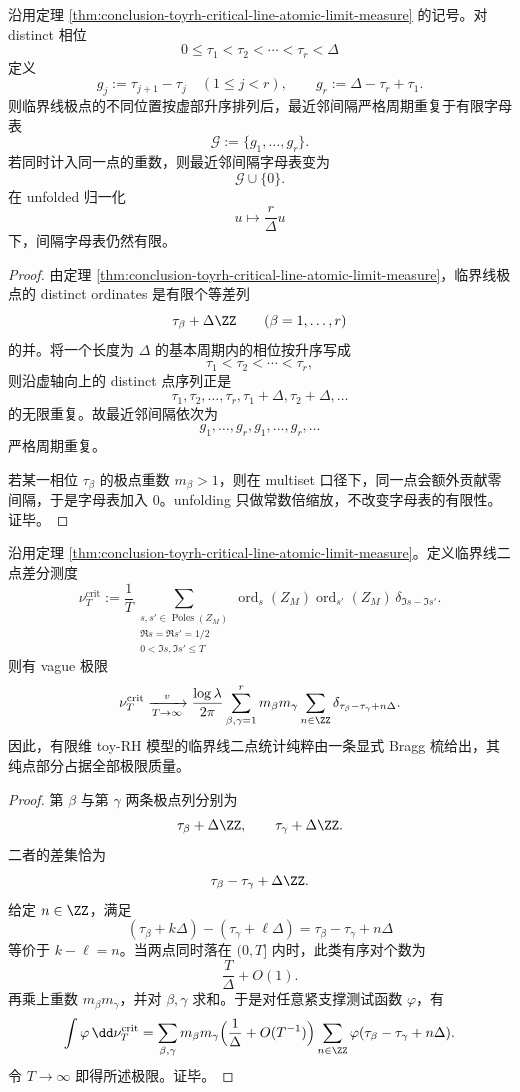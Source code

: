 \begin{theorem}[临界线最近邻间隔的有限字母表]\label{thm:conclusion-toyrh-critical-line-nearest-neighbor-finite-alphabet}
沿用定理 \ref{thm:conclusion-toyrh-critical-line-atomic-limit-measure} 的记号。对 distinct 相位
\[
0\le \tau_1<\tau_2<\cdots<\tau_r<\Delta
\]
定义
\[
g_j:=\tau_{j+1}-\tau_j\quad(1\le j<r),
\qquad
g_r:=\Delta-\tau_r+\tau_1.
\]
则临界线极点的不同位置按虚部升序排列后，最近邻间隔严格周期重复于有限字母表
\[
\mathcal G:=\{g_1,\dots,g_r\}.
\]
若同时计入同一点的重数，则最近邻间隔字母表变为
\[
\mathcal G\cup\{0\}.
\]
在 unfolded 归一化
\[
u\longmapsto \frac{r}{\Delta}u
\]
下，间隔字母表仍然有限。
\end{theorem}
\begin{proof}
由定理 \ref{thm:conclusion-toyrh-critical-line-atomic-limit-measure}，临界线极点的 distinct ordinates 是有限个等差列
\[
\tau_\beta+\Delta\ZZ
\qquad (\beta=1,\dots,r)
\]
的并。将一个长度为 \(\Delta\) 的基本周期内的相位按升序写成
\[
\tau_1<\tau_2<\cdots<\tau_r,
\]
则沿虚轴向上的 distinct 点序列正是
\[
\tau_1,\tau_2,\dots,\tau_r,\tau_1+\Delta,\tau_2+\Delta,\dots
\]
的无限重复。故最近邻间隔依次为
\[
g_1,\dots,g_r,g_1,\dots,g_r,\dots
\]
严格周期重复。

若某一相位 \(\tau_\beta\) 的极点重数 \(m_\beta>1\)，则在 multiset 口径下，同一点会额外贡献零间隔，于是字母表加入 \(0\)。unfolding 只做常数倍缩放，不改变字母表的有限性。证毕。
\end{proof}

\begin{theorem}\label{thm:conclusion-toyrh-critical-line-bragg-comb}
沿用定理 \ref{thm:conclusion-toyrh-critical-line-atomic-limit-measure}。定义临界线二点差分测度
\[
\nu_T^{\mathrm{crit}}
:=
\frac1T
\sum_{\substack{s,s'\in\operatorname{Poles}(Z_M)\\
\Re s=\Re s'=1/2\\
0<\Im s,\Im s'\le T}}
\operatorname{ord}_s(Z_M)\operatorname{ord}_{s'}(Z_M)\,
\delta_{\Im s-\Im s'}.
\]
则有 vague 极限
\[
\nu_T^{\mathrm{crit}}
\xrightarrow[T\to\infty]{v}
\frac{\log\lambda}{2\pi}
\sum_{\beta,\gamma=1}^{r}
m_\beta m_\gamma
\sum_{n\in\ZZ}\delta_{\tau_\beta-\tau_\gamma+n\Delta}.
\]
因此，有限维 toy-RH 模型的临界线二点统计纯粹由一条显式 Bragg 梳给出，其纯点部分占据全部极限质量。
\end{theorem}
\begin{proof}
第 \(\beta\) 与第 \(\gamma\) 两条极点列分别为
\[
\tau_\beta+\Delta\ZZ,
\qquad
\tau_\gamma+\Delta\ZZ.
\]
二者的差集恰为
\[
\tau_\beta-\tau_\gamma+\Delta\ZZ.
\]
给定 \(n\in\ZZ\)，满足
\[
(\tau_\beta+k\Delta)-(\tau_\gamma+\ell\Delta)
=
\tau_\beta-\tau_\gamma+n\Delta
\]
等价于 \(k-\ell=n\)。当两点同时落在 \((0,T]\) 内时，此类有序对个数为
\[
\frac{T}{\Delta}+O(1).
\]
再乘上重数 \(m_\beta m_\gamma\)，并对 \(\beta,\gamma\) 求和。于是对任意紧支撑测试函数 \(\varphi\)，有
\[
\int \varphi\,\dd \nu_T^{\mathrm{crit}}
=
\sum_{\beta,\gamma}
m_\beta m_\gamma
\Bigl(\frac1\Delta+O(T^{-1})\Bigr)
\sum_{n\in\ZZ}\varphi(\tau_\beta-\tau_\gamma+n\Delta).
\]
令 \(T\to\infty\) 即得所述极限。证毕。
\end{proof}

